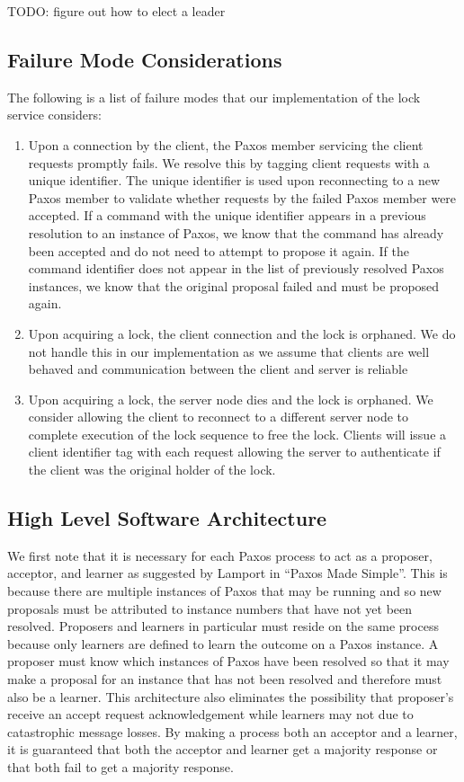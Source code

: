 \documentclass[11pt, onecolumn]{article}
\begin{document}
TODO: figure out how to elect a leader

\subsection{Failure Mode Considerations}

The following is a list of failure modes that our implementation of the lock service considers:

\begin{enumerate}
\item Upon a connection by the client, the Paxos member servicing the client requests promptly fails. 
  We resolve this by tagging client requests with a unique identifier.
  The unique identifier is used upon reconnecting to a new Paxos member to validate whether requests by the failed Paxos member were accepted.
  If a command with the unique identifier appears in a previous resolution to an instance of Paxos, we know that the command has already been accepted and do not need to attempt to propose it again.
  If the command identifier does not appear in the list of previously resolved Paxos instances, we know that the original proposal failed and must be proposed again.
\item Upon acquiring a lock, the client connection and the lock is orphaned. 
  We do not handle this in our implementation as we assume that clients are well behaved and communication between the client and server is reliable
\item Upon acquiring a lock, the server node dies and the lock is orphaned.
  We consider allowing the client to reconnect to a different server node to complete execution of the lock sequence to free the lock.
  Clients will issue a client identifier tag with each request allowing the server to authenticate if the client was the original holder of the lock.
\end{enumerate}

\subsection{High Level Software Architecture}

We first note that it is necessary for each Paxos process to act as a proposer, acceptor, and learner as suggested by Lamport in ``Paxos Made Simple''.
This is because there are multiple instances of Paxos that may be running and so new proposals must be attributed to instance numbers that have not yet been resolved.
Proposers and learners in particular must reside on the same process because only learners are defined to learn the outcome on a Paxos instance.
A proposer must know which instances of Paxos have been resolved so that it may make a proposal for an instance that has not been resolved and therefore must also be a learner.
This architecture also eliminates the possibility that proposer's receive an accept request acknowledgement while learners may not due to catastrophic message losses.
By making a process both an acceptor and a learner, it is guaranteed that both the acceptor and learner get a majority response or that both fail to get a majority response.
\end{document}
